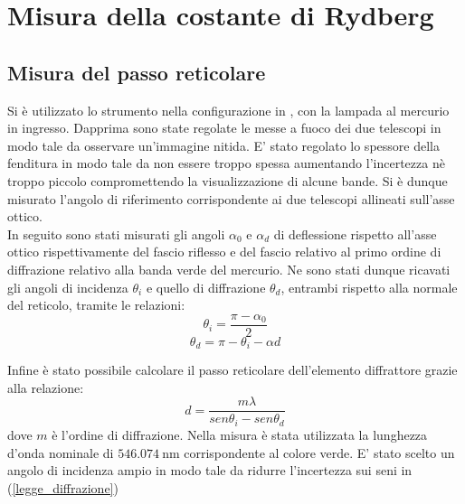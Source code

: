 \section{Misura della costante di Rydberg}

\subsection{Misura del passo reticolare}
Si è utilizzato lo strumento nella configurazione in , con la lampada al mercurio in ingresso. Dapprima sono state regolate le messe a fuoco dei due telescopi in modo tale da osservare un'immagine nitida. E' stato regolato lo spessore della fenditura in modo tale da non essere troppo spessa aumentando l'incertezza nè troppo piccolo compromettendo la visualizzazione di alcune bande. Si è dunque misurato l'angolo di riferimento corrispondente ai due telescopi allineati sull'asse ottico.\\
 In seguito sono stati misurati gli angoli $\alpha_{0}$ e $\alpha_{d}$ di deflessione rispetto all'asse ottico rispettivamente del fascio riflesso e del fascio relativo al primo ordine di diffrazione relativo alla banda verde del mercurio. Ne sono stati dunque ricavati gli angoli di incidenza $\theta_{i}$ e quello di diffrazione $\theta_{d}$, entrambi rispetto alla normale del reticolo, tramite le relazioni:
\begin{equation}
 \theta_{i}=\frac{\pi-\alpha_{0}}{2}
\end{equation}
\begin{equation}
 \theta_{d}=\pi-\theta_{i}-\alpha{d}
\end{equation}
 
Infine è stato possibile calcolare il passo reticolare dell'elemento diffrattore grazie alla relazione:
\begin{equation}
d = \frac{m\lambda}{sen\theta_{i} - sen\theta_{d}}
\label{e:legge_diffrazione}
\end{equation}
dove $m$ è l'ordine di diffrazione. Nella misura è stata utilizzata la lunghezza d'onda nominale di $\SI{546.074}{\nano\meter}$  corrispondente al colore verde. E' stato scelto un angolo di incidenza ampio in modo tale da ridurre l'incertezza sui seni in (\ref{legge_diffrazione})\\

